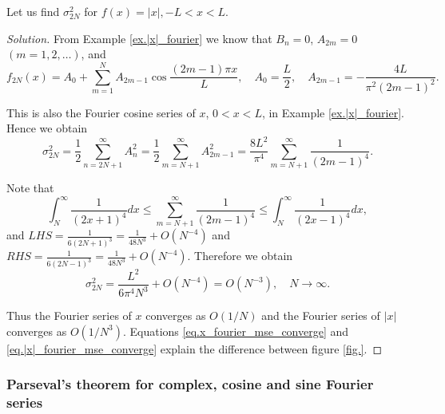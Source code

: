 \begin{example}[]
Let us find $\sigma_{2 N}^2$ for $f(x)=|x|,-L<x<L$.
\end{example}
\begin{proof}[Solution]
From Example \ref{ex.|x|_fourier} we know that $B_n=0$, $A_{2 m}=0$ $(m=1,2, \ldots)$, and
$$
f_{2 N}(x)=A_0+\sum_{m=1}^N A_{2 m-1} \cos \frac{(2 m-1) \pi x}{L}, \quad A_0=\frac{L}{2}, \quad A_{2 m-1}=-\frac{4 L}{\pi^2(2 m-1)^2} .
$$

This is also the Fourier cosine series of $x$, $0<x<L$, in Example \ref{ex.|x|_fourier}. Hence we obtain
$$
\sigma_{2 N}^2=\frac{1}{2} \sum_{n=2 N+1}^{\infty} A_n^2=\frac{1}{2} \sum_{m=N+1}^{\infty} A_{2 m-1}^2=\frac{8 L^2}{\pi^4} \sum_{m=N+1}^{\infty} \frac{1}{(2 m-1)^4} .
$$

Note that
$$
\int_N^{\infty} \frac{1}{(2 x+1)^4} d x \leq \sum_{m=N+1}^{\infty} \frac{1}{(2 m-1)^4} \leq \int_N^{\infty} \frac{1}{(2 x-1)^4} d x,
$$
and $\textit{LHS}=\frac{1}{6(2 N+1)^3}=\frac{1}{48 N^3}+O\left(N^{-4}\right)$ and $\textit{RHS}=\frac{1}{6(2 N-1)^3}=\frac{1}{48 N^3}+O\left(N^{-4}\right)$.
Therefore we obtain
\begin{equation}\label{eq.|x|_fourier_mse_converge}
    \sigma_{2 N}^2=\frac{L^2}{6 \pi^4 N^3}+O\left(N^{-4}\right)=O\left(N^{-3}\right), \quad N \rightarrow \infty .
\end{equation}

Thus the Fourier series of $x$ converges as $O(1 / N)$ and the Fourier series of $|x|$ converges as $O\left(1 / N^3\right)$. Equations \eqref{eq.x_fourier_mse_converge} and \eqref{eq.|x|_fourier_mse_converge} explain the difference between figure \ref{fig.}.
\end{proof}

\subsubsection{Parseval's theorem for complex, cosine and sine Fourier series}


